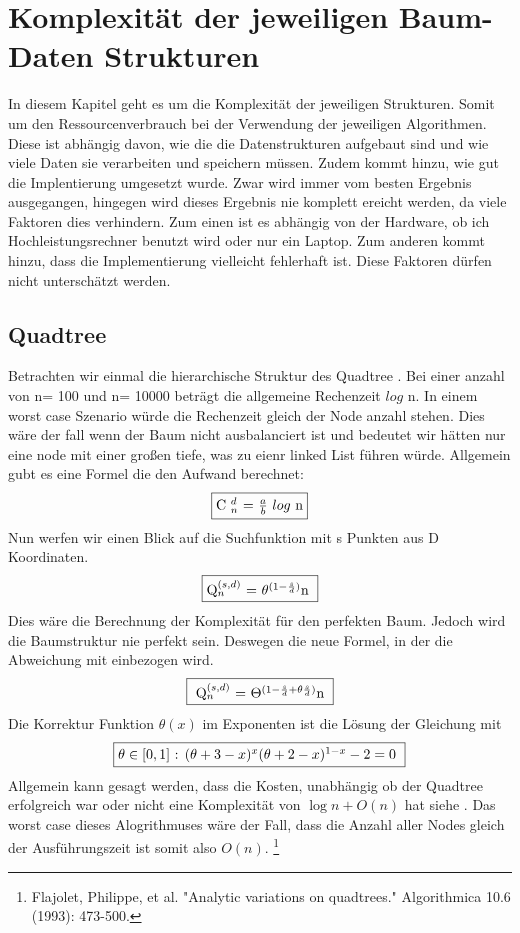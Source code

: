 \documentclass[11pt]{article}
\newcommand{\qt}{Quadtree }
\begin{document}
\pagebreak

\section{Komplexität der jeweiligen Baum-Daten Strukturen}
In diesem Kapitel geht es um die Komplexität der jeweiligen Strukturen. Somit um den Ressourcenverbrauch bei der Verwendung der jeweiligen Algorithmen. Diese ist abhängig davon, wie die die Datenstrukturen aufgebaut sind und wie viele Daten sie verarbeiten und speichern müssen. 
Zudem kommt hinzu, wie gut die Implentierung umgesetzt wurde. Zwar wird immer vom besten Ergebnis ausgegangen, hingegen wird dieses Ergebnis nie komplett ereicht werden, da viele Faktoren dies verhindern. Zum einen ist es abhängig von der Hardware, ob ich Hochleistungsrechner benutzt wird oder nur ein Laptop.
Zum anderen kommt hinzu, dass die Implementierung vielleicht fehlerhaft ist. Diese Faktoren dürfen nicht unterschätzt werden. 


\subsection{\qt}

Betrachten wir einmal die hierarchische Struktur des \qt. Bei einer anzahl von n= 100 und n= 10000 beträgt die allgemeine Rechenzeit $log$ n. In einem worst case Szenario würde die Rechenzeit gleich der Node anzahl stehen. Dies wäre der fall wenn der Baum nicht ausbalanciert ist und bedeutet wir hätten nur eine node mit einer großen tiefe, was zu eienr linked List führen würde.
Allgemein gubt es eine Formel die den Aufwand berechnet: 
\begin{equation*}
    \fbox{C  $_n^d$ $=$ $\frac{a}{b}$ $log$ n} 
\end{equation*} 
Nun werfen wir einen Blick auf die Suchfunktion mit s Punkten aus D Koordinaten. \newline
\begin{equation*}
    \fbox{Q$_n^{(s,d)}$ $=$ $\theta^{(1- \frac{s}{d})}$n  }
\end{equation*}
Dies wäre die Berechnung der Komplexität für den perfekten Baum. Jedoch wird die Baumstruktur nie perfekt sein. 
Deswegen die neue Formel, in der die Abweichung mit einbezogen wird. 
\begin{equation*}
    \fbox{ Q$_n^{(s,d)}$ $=$ $\Theta^{(1- \frac{s}{d} + \theta\frac{s}{d})}$n }
\end{equation*}
Die Korrektur Funktion $\theta(x)$ im Exponenten ist die Lösung der Gleichung mit 
\begin{equation*}
    \fbox{$\theta \in [0,1]$ :  $(\theta + 3 -x)^x(\theta + 2 - x)^{1-x} -2 = 0$ }
\end{equation*}
Allgemein kann gesagt werden, dass die Kosten, unabhängig ob der \qt erfolgreich war oder nicht eine Komplexität von $\log n + O(n)$ hat siehe \cite[S.475ff]{quadtree} .
Das worst case dieses Alogrithmuses wäre der Fall, dass die Anzahl aller Nodes gleich der Ausführungszeit ist somit also $O(n)$. \footnote[1]{Flajolet, Philippe, et al. "Analytic variations on quadtrees." Algorithmica 10.6 (1993): 473-500.}
\end{document}
